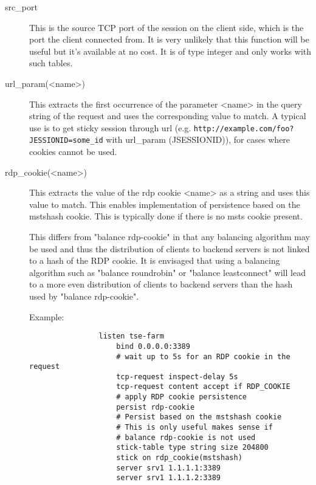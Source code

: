 \begin{description}
\item[src\_port] 
               This is the source TCP port of the session on the client side,
               which is the port the client connected from. It is very unlikely
               that this function will be useful but it's available at no cost.
               It is of type integer and only works with such tables.

\item[url\_param(<name>)]
               This extracts the first occurrence of the parameter <name> in
               the query string of the request and uses the corresponding value
               to match. A typical use is to get sticky session through url
               (e.g. \verb|http://example.com/foo?JESSIONID=some_id| with
               url\_param (JSESSIONID)), for cases where cookies cannot be used.

\item[rdp\_cookie(<name>)]
               This extracts the value of the rdp cookie <name> as a string
               and uses this value to match. This enables implementation of
               persistence based on the mstshash cookie. This is typically
               done if there is no msts cookie present.

               This differs from "balance rdp-cookie" in that any balancing
               algorithm may be used and thus the distribution of clients
               to backend servers is not linked to a hash of the RDP
               cookie. It is envisaged that using a balancing algorithm
               such as "balance roundrobin" or "balance leastconnect" will
               lead to a more even distribution of clients to backend
               servers than the hash used by "balance rdp-cookie".

               Example:
               \begin{verbatim}
                listen tse-farm
                    bind 0.0.0.0:3389
                    # wait up to 5s for an RDP cookie in the request
                    tcp-request inspect-delay 5s
                    tcp-request content accept if RDP_COOKIE
                    # apply RDP cookie persistence
                    persist rdp-cookie
                    # Persist based on the mstshash cookie
                    # This is only useful makes sense if
                    # balance rdp-cookie is not used
                    stick-table type string size 204800
                    stick on rdp_cookie(mstshash)
                    server srv1 1.1.1.1:3389
                    server srv1 1.1.1.2:3389
               \end{verbatim}


\end{description}
